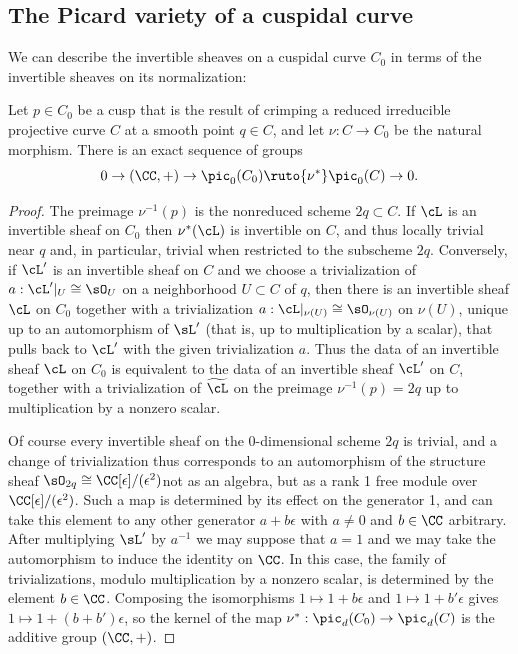 \subsection*{The Picard variety of a cuspidal curve}

\!We can describe the invertible sheaves on a cuspidal curve $C_{0}$
%
%
in terms of the invertible sheaves on its
normalization:

\begin{proposition}\label{torsion free on cuspidal}
Let $p\in C_{0}$ be a cusp that is the result of crimping a reduced
irreducible projective curve $C$ at a smooth point $q\in C$,
and let $\nu: C\to C_{0}$ be the natural morphism.
There is an exact sequence of groups
$$
0 \to (\CC,+) \to \pic_0(C_{0}) \ruto {\nu^*} \pic_0(C) \to 0.
$$
\end{proposition}

\begin{proof}
The preimage $\nu^{-1}(p)$ is the nonreduced scheme $2q \subset C$. If
$\cL$ is an invertible sheaf on
$C_{0}$ then $\nu^{*}(\cL)$ is invertible on $C$, and thus locally
trivial near $q$ and, in particular, trivial
when restricted to the subscheme $2q$. Conversely,
if $\cL'$ is an invertible sheaf on $C$ and we choose a trivialization
of $a: \cL'|_{U}\cong \sO_{U}$ on a neighborhood $ U\subset C$
of $q$, then there is an invertible sheaf $\cL$ on $C_{0}$ together with
a  trivialization
$a: \cL|_{\nu(U)}\cong \sO_{\nu(U)}$
on $\nu(U)$, unique up to an automorphism of $\sL'$ (that is, up to
multiplication by a scalar), that
pulls back to $\cL'$ with the given trivialization $a$.
Thus the data of an invertible sheaf $\cL$ on $C_0$ is equivalent
to the data of an invertible sheaf $\cL'$ on $C$, together with a
trivialization of $\widetilde \cL$ on the preimage $\nu^{-1}(p) = 2q$
up to multiplication by a nonzero scalar.

Of course every invertible sheaf on the 
0-dimensional
scheme $2q$
is trivial, and a change of trivialization
thus corresponds to an automorphism of the structure sheaf $\sO_{2q}
\cong \CC[\epsilon]/(\epsilon^{2})$\emdash not as an algebra, but as a
rank 1 free module over $\CC[\epsilon]/(\epsilon^{2})$. Such a map is
determined by
its effect on the generator 1, and can take this element to any other
generator $a+b\epsilon$ with
$a\neq 0$ and $b\in \CC$ arbitrary. After multiplying $\sL'$ by $a^{-1}$
we may suppose that $a =1$ and we may take the automorphism to induce
the identity on $\CC$.
In this case, the family of trivializations, modulo multiplication by
a nonzero scalar, is
determined by the element $b\in \CC$. 
Composing the isomorphisms
$1\mapsto 1+b\epsilon$ and $1\mapsto 1+b'\epsilon$  gives $1\mapsto
1+(b+b')\epsilon$,
so the kernel of the map $\nu^{*}: \pic_{d}(C_{0}) \to \pic_{d}(C)$ is
the additive group $(\CC, +)$.
\end{proof}

